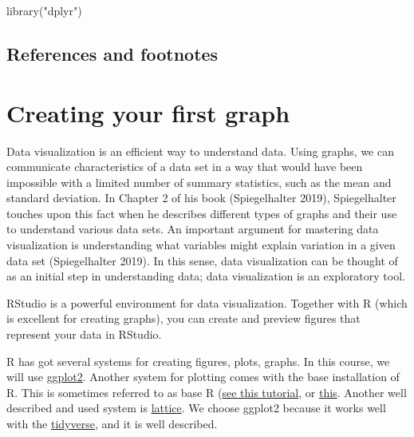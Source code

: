 \documentclass[
  11pt,
  letterpaper,
]{scrbook}
\newenvironment{Shaded}{\begin{snugshade}}{\end{snugshade}}
\newcommand{\FunctionTok}[1]{\textcolor[rgb]{0.28,0.35,0.67}{#1}}
\newcommand{\NormalTok}[1]{\textcolor[rgb]{0.00,0.23,0.31}{#1}}
\newcommand{\StringTok}[1]{\textcolor[rgb]{0.13,0.47,0.30}{#1}}
\begin{document}
\begin{Shaded}
\begin{Highlighting}[numbers=left,,]
\FunctionTok{library}\NormalTok{(}\StringTok{"dplyr"}\NormalTok{)}
\end{Highlighting}
\end{Shaded}

\hypertarget{references-and-footnotes-2}{%
\section{References and footnotes}\label{references-and-footnotes-2}}


\hypertarget{creating-your-first-graph}{%
\chapter{Creating your first graph}\label{creating-your-first-graph}}

Data visualization is an efficient way to understand data. Using graphs,
we can communicate characteristics of a data set in a way that would
have been impossible with a limited number of summary statistics, such
as the mean and standard deviation. In Chapter 2 of his book
(Spiegelhalter 2019), Spiegelhalter touches upon this fact when he
describes different types of graphs and their use to understand various
data sets. An important argument for mastering data visualization is
understanding what variables might explain variation in a given data set
(Spiegelhalter 2019). In this sense, data visualization can be thought
of as an initial step in understanding data; data visualization is an
exploratory tool.

RStudio is a powerful environment for data visualization. Together with
R (which is excellent for creating graphs), you can create and preview
figures that represent your data in RStudio.

R has got several systems for creating figures, plots, graphs. In this
course, we will use \href{https://ggplot2.tidyverse.org/}{ggplot2}.
Another system for plotting comes with the base installation of R. This
is sometimes referred to as base R
(\href{https://rstudio-pubs-static.s3.amazonaws.com/84527_6b8334fd3d9348579681b24d156e7e9d.html}{see
this tutorial}, or
\href{http://www.sthda.com/english/wiki/r-base-graphs}{this}. Another
well described and used system is
\href{https://www.statmethods.net/advgraphs/trellis.html}{lattice}. We
choose ggplot2 because it works well with the
\href{https://www.tidyverse.org/}{tidyverse}, and it is well described.
\end{document}
